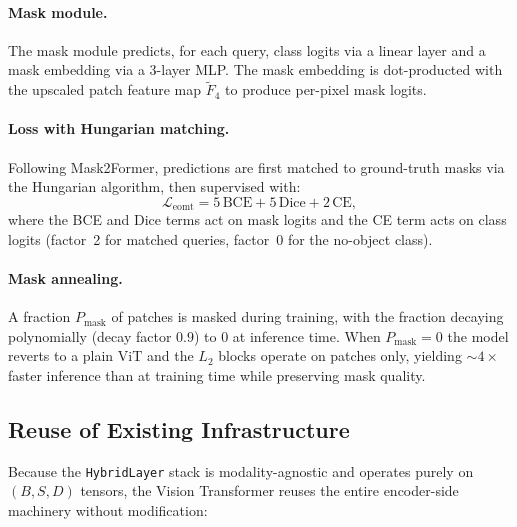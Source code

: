 \paragraph{Mask module.}
The mask module predicts, for each query, class logits via a linear layer and a mask embedding via a 3-layer MLP. The mask embedding is dot-producted with the upscaled patch feature map $\tilde{F}_4$ to produce per-pixel mask logits.

\paragraph{Loss with Hungarian matching.}
Following Mask2Former, predictions are first matched to ground-truth masks via the Hungarian algorithm, then supervised with:
\[
\mathcal{L}_\text{eomt} = 5\,\mathrm{BCE} + 5\,\mathrm{Dice} + 2\,\mathrm{CE},
\]
where the BCE and Dice terms act on mask logits and the CE term acts on class logits (factor~2 for matched queries, factor~0 for the no-object class).

\paragraph{Mask annealing.}
A fraction $P_\text{mask}$ of patches is masked during training, with the fraction decaying polynomially (decay factor $0.9$) to $0$ at inference time. When $P_\text{mask}=0$ the model reverts to a plain ViT and the $L_2$ blocks operate on patches only, yielding $\sim 4\times$ faster inference than at training time while preserving mask quality.

\subsection{Reuse of Existing Infrastructure}

Because the \texttt{HybridLayer} stack is modality-agnostic and operates purely on $(B, S, D)$ tensors, the Vision Transformer reuses the entire encoder-side machinery without modification:

